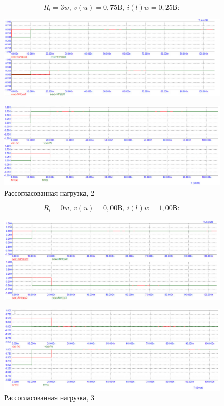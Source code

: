 \documentclass[a4paper, 14pt]{extarticle}%
\begin{document}
\[R_l =3w,\  v(u)=0,75 \text{B},\ i(l)w =0,25 \text{В} :\]

\begin{figure}[h!]
			\centering
			\includegraphics[width=1.1\linewidth]{./graphs/8.jpg}
			\label{3.2.1}
\end{figure}


\begin{figure}[h!]
			\centering
			\includegraphics[width=1.1\linewidth]{./graphs/9.jpg}
			\caption{Рассогласованная нагрузка, 2}
			\label{3.2.2}
\end{figure}

\[R_l =0w,\  v(u)=0,00 \text{B},\ i(l)w =1,00 \text{В} :\]

\begin{figure}[h!]
			\centering
			\includegraphics[width=1.1\linewidth]{./graphs/10.jpg}
			\label{3.3.1}
\end{figure}

\newpage

\begin{figure}[h!]
			\centering
			\includegraphics[width=1.1\linewidth]{./graphs/11.jpg}
			\caption{Рассогласованная нагрузка, 3}
			\label{3.3.2}
\end{figure}
\end{document}
